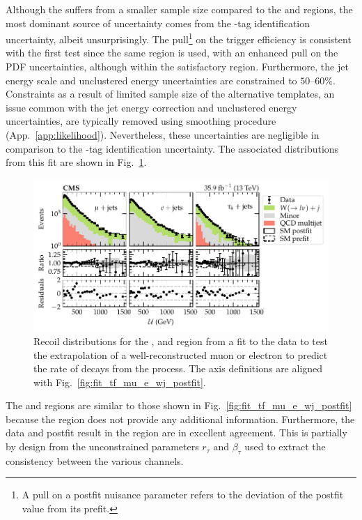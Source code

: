 %
Although the \tauplusjets suffers from a smaller sample size compared to the
\muplusjets and \eleplusjets regions, the most dominant source of uncertainty
comes from the \Ptauh-tag identification uncertainty, albeit unsurprisingly.
The pull\footnote{A pull on a postfit nuisance parameter refers to the
deviation of the postfit value from its prefit.} on the \ptmiss trigger
efficiency is consistent with the first test since the same region is used,
with an enhanced pull on the PDF uncertainties, although within the
satisfactory region. Furthermore, the jet energy scale and unclustered energy
uncertainties are constrained to $50$--$60\%$. Constraints as a result of
limited sample size of the alternative templates, an issue common with the jet
energy correction and unclustered energy uncertainties, are typically removed
using smoothing procedure (App.~\ref{app:likelihood}). Nevertheless, these
uncertainties are negligible in comparison to the \Ptauh-tag identification
uncertainty. The associated \recoil distributions from this fit are shown in
Fig.~\ref{fig:fit_tf_mue_t_wj_postfit}.
%
\begin{figure}[htb]
    \centering
    \includegraphics{chapters/042_backgrounds/images/postfit_tfmue2twj.pdf}
    \caption[Recoil distributions corrected by the transfer factor from the muon and electron control regions to the $\tau$-lepton validation region.]{
        Recoil distributions for the \muplusjets, \eleplusjets and \tauplusjets region from a fit to the data to test the extrapolation of a well-reconstructed muon or electron to predict the rate of \Ptauh decays from the \IWj process. The axis definitions are aligned with Fig.~\ref{fig:fit_tf_mu_e_wj_postfit}.
    }
    \label{fig:fit_tf_mue_t_wj_postfit}
\end{figure}
%
The \muplusjets and \eleplusjets regions are similar to those shown in
Fig.~\ref{fig:fit_tf_mu_e_wj_postfit} because the \tauplusjets region does not
provide any additional information. Furthermore, the data and postfit result
in the \tauplusjets region are in excellent agreement. This is partially by
design from the unconstrained parameters $r_\tau$ and $\beta_\tau$ used to
extract the consistency between the various channels.

